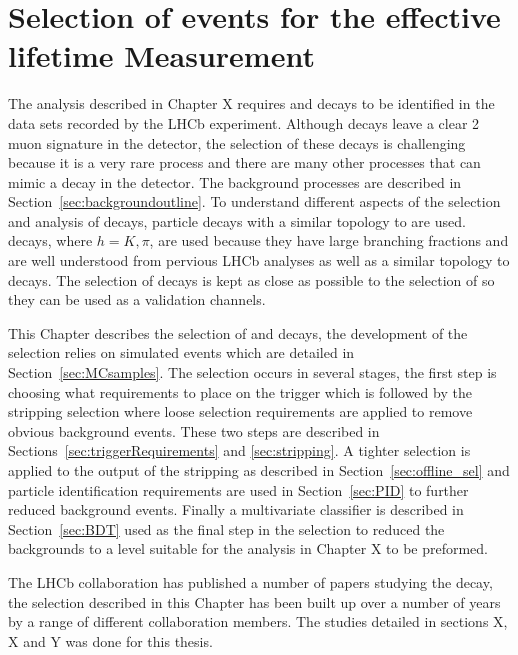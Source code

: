 \chapter{Selection of \bsmumu events for the effective lifetime Measurement}
\label{selection_chapter}
The analysis described in Chapter X requires \bsmumu and \bhh decays to be identified in the data sets recorded by the LHCb experiment. Although \bsmumu decays leave a clear 2 muon signature in the detector, the selection of these decays is challenging because it is a very rare process and there are many other processes that can mimic a \BsMuMu decay in the detector. The background processes are described in Section~\ref{sec:backgroundoutline}. To understand different aspects of the selection and analysis of \BsMuMu decays, particle decays with a similar topology to \BsMuMu are used. \bhh decays, where $h = K, \pi$, are used because they have large branching fractions and are well understood from pervious LHCb analyses as well as a similar topology to \bsmumu decays. The selection of \bhh decays is kept as close as possible to the selection of \bsmumu so they can be used as a validation channels.

This Chapter describes the selection of \bsmumu and \bhh decays, the development of the selection relies on simulated events which are detailed in Section~\ref{sec:MCsamples}. The selection occurs in several stages, the first step is choosing what requirements to place on the trigger which is followed by the stripping selection where loose selection requirements are applied to remove obvious background events. These two steps are described in Sections~\ref{sec:triggerRequirements} and \ref{sec:stripping}. A tighter selection is applied to the output of the stripping as described in Section~\ref{sec:offline_sel} and particle identification requirements are used in Section~\ref{sec:PID} to further reduced background events. Finally a multivariate classifier is described in Section~\ref{sec:BDT} used as the final step in the selection to reduced the backgrounds to a level suitable for the analysis in Chapter X to be preformed. 


The LHCb collaboration has published a number of papers studying the \bsmumu decay, the selection described in this Chapter has been built up over a number of years by a range of different collaboration members. The studies detailed in sections X, X and Y was done for this thesis.





